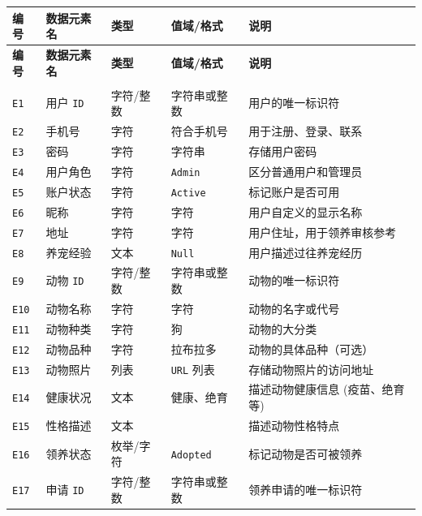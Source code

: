 \documentclass[12pt,a4paper,UTF8]{article}
\begin{document}
\begin{xltabular}{\linewidth}{
  |>{\centering\arraybackslash}m{1cm}
  |>{\centering\arraybackslash}m{2cm}
  |>{\centering\arraybackslash}m{2.5cm}
  |>{\centering\arraybackslash}m{3cm}
  |>{\centering\arraybackslash}m{6cm}|}
  \hline
  \textbf{编号} & \textbf{数据元素名} & \textbf{类型} & \textbf{值域/格式} & \textbf{说明} \\ \hline \endfirsthead
  \hline
  \textbf{编号} & \textbf{数据元素名} & \textbf{类型} & \textbf{值域/格式} & \textbf{说明} \\ \hline \endhead
  \hline
   \\ \endfoot
  \hline \endlastfoot

  \verb|E1| & 用户 \verb|ID| & 字符/整数 &  字符串或整数 & 用户的唯一标识符 \\ \hline
  \verb|E2| & 手机号 & 字符 & 符合手机号 & 用于注册、登录、联系 \\ \hline
  \verb|E3| & 密码 & 字符 & 字符串 & 存储用户密码\\ \hline
  \verb|E4| & 用户角色 & 字符 & \verb|Admin| & 区分普通用户和管理员 \\ \hline
  \verb|E5| & 账户状态 & 字符 & \verb|Active| & 标记账户是否可用 \\ \hline
  \verb|E6| & 昵称 & 字符 & 字符 & 用户自定义的显示名称 \\ \hline
  \verb|E7| & 地址 & 字符 & 字符 & 用户住址，用于领养审核参考 \\ \hline
  \verb|E8| & 养宠经验 & 文本 & \verb|Null| & 用户描述过往养宠经历 \\ \hline
  \verb|E9| & 动物 \verb|ID| & 字符/整数 & 字符串或整数 & 动物的唯一标识符 \\ \hline
  \verb|E10| & 动物名称 & 字符 & 字符 & 动物的名字或代号 \\ \hline
  \verb|E11| & 动物种类 & 字符 & 狗 & 动物的大分类 \\ \hline
  \verb|E12| & 动物品种 & 字符 & 拉布拉多 & 动物的具体品种（可选） \\ \hline
  \verb|E13| & 动物照片 & 列表 & \verb|URL| 列表 & 存储动物照片的访问地址 \\ \hline
  \verb|E14| & 健康状况 & 文本 & 健康、绝育 & 描述动物健康信息 (疫苗、绝育等) \\ \hline
  \verb|E15| & 性格描述 & 文本 &  & 描述动物性格特点 \\ \hline
  \verb|E16| & 领养状态 & 枚举/字符 & \verb|Adopted| & 标记动物是否可被领养 \\ \hline
  \verb|E17| & 申请 \verb|ID| & 字符/整数 & 字符串或整数 & 领养申请的唯一标识符 \\ \hline

\end{xltabular}
\end{document}
